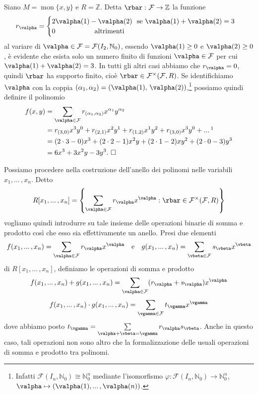 \begin{exm}Siano $M=\operatorname{mon}\{x,y\}$ e $R=\mathbb{Z}$. Detta $\rbar\,\colon \mathcal{F}\to \mathbb{Z}$ la funzione \[r_{\valpha} = \begin{cases}2\valpha(1)-\valpha(2) \text{ \ se } \valpha(1)+\valpha(2)=3 \\ 0 \text{ \ \ \ \ \ \ \ \ \ \ \ \ \ \ \ \ altrimenti}\end{cases}\] al variare di $\valpha\in\mathcal{F}= \mathcal{F}(I_2,\mathbb{N}_0)$, essendo $\valpha(1)\geq 0$ e $\valpha(2)\geq 0$, è evidente che esista solo un numero finito di funzioni $\valpha\in \mathcal{F}$ per cui $\valpha(1)+\valpha(2)=3$. In tutti gli altri casi abbiamo che $r_{\valpha}=0$, quindi $\rbar$ ha supporto finito, cioè $\rbar\in\mathcal{F}^{\times}(\mathcal{F},R)$. Se identifichiamo $\valpha$ con la coppia $(\alpha_1,\alpha_2)=(\valpha(1),\,\valpha(2))$,\footnote{Infatti $\mathcal{F}(I_n,\mathbb{N}_0)\cong \mathbb{N}_0^n$ mediante l'isomorfismo $\varphi\colon \mathcal{F}(I_n,\mathbb{N}_0)\to \mathbb{N}_0^n$, $\valpha \mapsto (\valpha(1),...\,,\valpha(n))$.} possiamo quindi definire il polinomio \begin{align*}f(x,y) &= \sum\limits_{\valpha\in \mathcal{F}}r_{(\alpha_1,\alpha_2)} x^{\alpha_1}y^{\alpha_2} \\ &= r_{(3,0)}x^3y^0+r_{(2,1)}x^2y^1+r_{(1,2)}x^1y^2+r_{(3,0)}x^3y^0+...\,\footnotemark \\ &= (2\cdot 3-0)x^3+(2\cdot 2-1)x^2y+(2\cdot 1-2)xy^2+(2\cdot 0-3)y^3 \\ &= 6x^3+3x^2y-3y^3.\ \square\end{align*}\end{exm}

\clearpage

\noindent Possiamo procedere nella costruzione dell'anello dei polinomi nelle variabili $x_1,...\,,x_n$. Detto $$R[x_1,...\,,x_n]=\left\{ \sum\limits_{\valpha\in \mathcal{F}} r_{\valpha} x^{\valpha} : \rbar \in \mathcal{F}^{\times}(\mathcal{F},R) \right\}$$ vogliamo quindi introdurre su tale insieme delle operazioni binarie di somma e prodotto così che esso sia effettivamente un anello. Presi due elementi $$f(x_1,...\,,x_n) = \sum\limits_{\valpha\in \mathcal{F}}r_{\valpha} x^{\valpha} \ \ \text{ e } \ \ g(x_1,...\,,x_n)=\sum\limits_{\vbeta\in \mathcal{F}}s_{\vbeta} x^{\vbeta}$$ di $R[x_1,...\,,x_n]$, definiamo le operazioni di somma e prodotto $$f(x_1,...\,,x_n)+g(x_1,...\,,x_n)=\sum\limits_{\valpha\in \mathcal{F}}(r_{\valpha}+s_{\valpha}) x^{\valpha}$$ $$f(x_1,...\,,x_n)\cdot g(x_1,...\,,x_n)=\sum\limits_{\vgamma \in \mathcal{F}}t_{\vgamma}x^{\vgamma}$$ dove abbiamo posto $t_{\vgamma}=\sum\limits_{\valpha+\vbeta=\vgamma} r_{\valpha}s_{\vbeta}$. Anche in questo caso, tali operazioni non sono altro che la formalizzazione delle usuali operazioni di somma e prodotto tra polinomi. 

